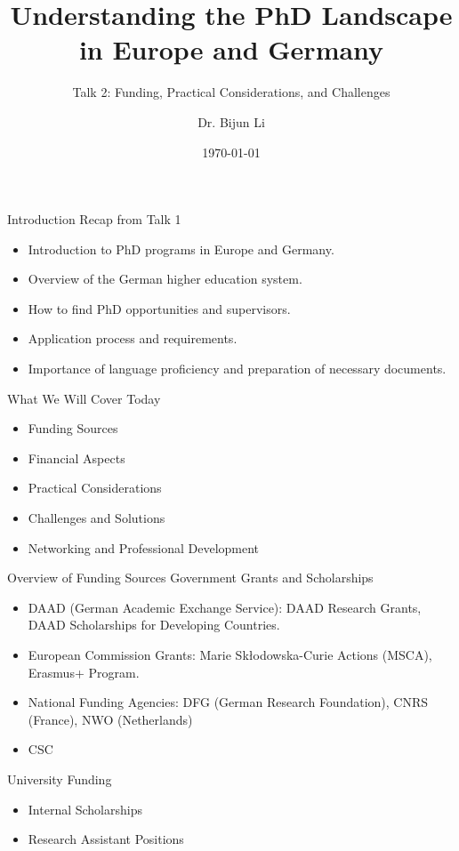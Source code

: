\documentclass[10pt]{beamer}
\title{Understanding the PhD Landscape in Europe and Germany}
\subtitle{Talk 2: Funding, Practical Considerations, and Challenges}
\date{\today}
\author{Dr. Bijun Li}
\begin{document}
\maketitle


\begin{frame}[fragile]{Introduction}
\alert{Recap from Talk 1}
\begin{itemize}
	\item Introduction to PhD programs in Europe and Germany.
	\item Overview of the German higher education system.
	\item How to find PhD opportunities and supervisors.
	\item Application process and requirements.
	\item Importance of language proficiency and preparation of necessary documents.
\end{itemize}

\alert{What We Will Cover Today}
\begin{itemize}
	\item Funding Sources
	\item Financial Aspects
	\item Practical Considerations
	\item Challenges and Solutions
	\item Networking and Professional Development
\end{itemize}
\end{frame}

\begin{frame}[fragile]{Overview of Funding Sources}
\alert{Government Grants and Scholarships}
\begin{itemize}
	\item DAAD (German Academic Exchange Service): DAAD Research Grants, DAAD Scholarships for Developing Countries.
	\item European Commission Grants: Marie Skłodowska-Curie Actions (MSCA), Erasmus+ Program.
	\item National Funding Agencies: DFG (German Research Foundation), CNRS (France), NWO (Netherlands)
	\item CSC
\end{itemize}
\alert{University Funding}
\begin{itemize}
	\item Internal Scholarships
	\item Research Assistant Positions
\end{itemize}
\end{frame}
\end{document}

